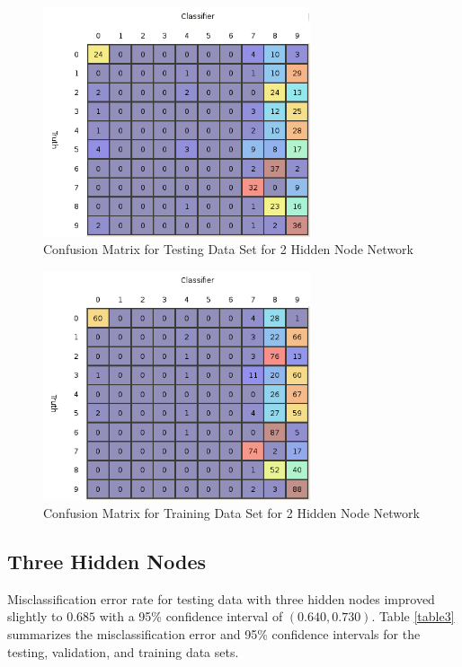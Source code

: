 \documentclass{article}
\begin{document}
\begin{figure}
\centering
\includegraphics[width=0.7\textwidth]{data/final/2_test_confusion.png}
\caption{Confusion Matrix for Testing Data Set for 2 Hidden Node Network}
\label{testconfusion2}
\end{figure}

\begin{figure}
\centering
\includegraphics[width=0.7\textwidth]{data/final/2_train_confusion.png}
\caption{Confusion Matrix for Training Data Set for 2 Hidden Node Network}
\label{trainconfusion2}
\end{figure}

\subsection{Three Hidden Nodes}\label{hidden3}

Misclassification error rate for testing data with three hidden nodes improved slightly to \(0.685\) with a 95\% confidence interval of \((0.640 , 0.730)\). Table \ref{table3} summarizes the misclassification error and 95\% confidence intervals for the testing, validation, and training data sets.
\end{document}
